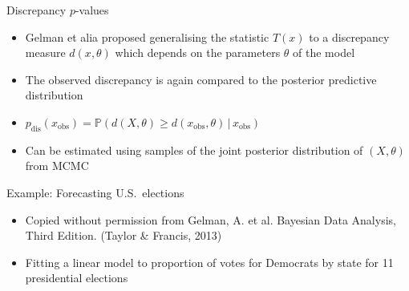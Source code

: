 \begin{frame}{Discrepancy $p$-values}
  \begin{itemize}
    \item Gelman et alia \cite{Gelman1996-ez} proposed generalising the statistic $T(x)$ to a discrepancy measure $d(x, \theta)$ which depends on the parameters $\theta$ of the model
    \vspace{\baselineskip}
    \pause
    \item The observed discrepancy is again compared to the posterior predictive distribution
    \vspace{\baselineskip}
    \pause
    \item $p_{\textrm{dis}}(x_{\textrm{obs}}) = \mathbb{P}(d(X,\theta) \geq d(x_{\textrm{obs}},\theta)\,|\,x_{\textrm{obs}})$
    \vspace{\baselineskip}
    \pause
    \item Can be estimated using samples of the joint posterior distribution of $(X, \theta)$ \eg from MCMC
  \end{itemize}
\end{frame}

\begin{frame}{Example: Forecasting U.S.\ elections}
  \begin{itemize}
    \item Copied without permission from Gelman, A. et al. Bayesian Data Analysis, Third Edition. (Taylor \& Francis, 2013)
    \vspace{\baselineskip}
    \item Fitting a linear model to proportion of votes for Democrats by state for 11 presidential elections
  \end{itemize}
  \begin{center}
  \end{center}
\end{frame}

